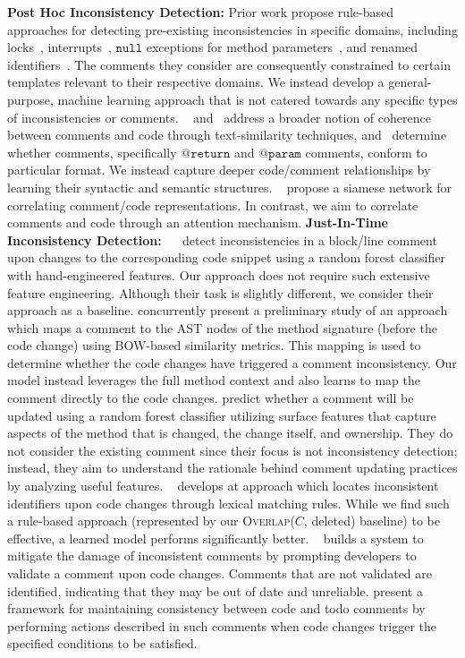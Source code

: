 \documentclass[letterpaper]{article} %
\makeatletter
\newcommand{\CodeIn}[1]{{\ifmmode{\mathtt{#1}}\else$\mathtt{#1}$\fi}}
\newcommand{\Return}{\CodeIn{@return}}
\newcommand{\Param}{\CodeIn{@param}}
\newcommand{\Comment}{$C$}
\newcommand{\HasOverlap}{\textsc{Overlap}}
\newcommand{\DeletedCode}{deleted}
\makeatother
\begin{document}
\noindent\textbf{Post Hoc Inconsistency Detection:}
Prior work propose rule-based approaches for detecting pre-existing inconsistencies in specific domains, including locks~\cite{icomment2007}, interrupts~\cite{aComment}, \CodeIn{null} exceptions for method parameters~\cite{ZhouParameter,tComment}, and renamed identifiers~\cite{ratol2017fragile}. The comments they consider are consequently constrained to certain templates relevant to their respective domains. We instead develop a general-purpose, machine learning approach that is not catered towards any specific types of inconsistencies or comments. \citeauthor{Corazza18}~ and~\citet{Cimasa19} address a broader notion of coherence between comments and code through text-similarity techniques, and~\citet{Khamis2010AutomaticQA} determine whether comments, specifically \Return{} and \Param{} comments, conform to particular format. We instead capture deeper code/comment relationships by learning their syntactic and semantic structures. ~\citet{RabbiInconsistencySiamese} propose a siamese network
for correlating comment/code representations. In contrast, we aim to correlate comments and code through an attention mechanism.  \noindent\textbf{Just-In-Time Inconsistency Detection:}
~\citeauthor{LiuOutdatedLine}~ detect inconsistencies in a block/line comment upon changes to the corresponding code snippet using a random forest classifier with hand-engineered features. Our approach does not require such extensive feature engineering. Although their task is slightly different, we consider their approach as a baseline.
\citet{StulovaTowards} concurrently present a preliminary study of an approach which maps a comment to the AST nodes of the method signature (before the code change) using BOW-based similarity metrics. This mapping is used to determine whether the code changes have triggered a comment inconsistency. Our model instead leverages the full method context and also learns to map the comment directly to the code changes. \citet{Malik08} predict whether a comment will be updated using a random forest classifier utilizing surface features that capture aspects of the method that is changed, the change itself, and ownership. They do not consider the existing comment since their focus is not inconsistency detection; instead, they aim to understand the rationale behind comment updating practices by analyzing useful features. ~\citet{SaduThesis} develops at approach which locates inconsistent identifiers upon code changes through lexical matching rules. While we find such a rule-based approach (represented by our \HasOverlap{}(\Comment{}, \DeletedCode{}) baseline) to be effective, a learned model performs significantly better. ~\citet{Svensson2015ReducingOA} builds a system to mitigate the damage of inconsistent comments by prompting developers to validate a comment upon code changes. Comments that are not validated are identified, indicating that they may be out of date and unreliable. \citet{NieTrigit} present a framework for maintaining consistency between code and todo comments by performing actions described in such comments when code changes trigger the specified conditions to be satisfied.
\end{document}
